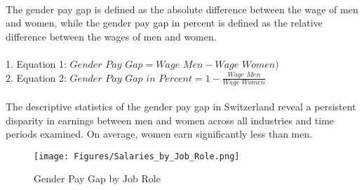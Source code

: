 \documentclass{article}
\begin{document}
\begin{table}[H]
\centering
{}\
\caption{Descriptive Statistics on Gender Pay Gap Across Switzerland and Years}
\end{table}

The gender pay gap is defined as the absolute difference between the wage of men and women, while the gender pay gap in percent is defined as the relative difference between the wages of men and women.\\
\\
  1. Equation 1: \(\textit{Gender Pay Gap} = \textit{Wage Men} - \textit{Wage Women)}\)\\
  2. Equation 2: \(\textit{Gender Pay Gap in Percent} = 1 - \frac{\textit{Wage Men}} 
 {\textit{Wage Women}}\)\\
\\
The descriptive statistics of the gender pay gap in Switzerland reveal a persistent disparity in earnings between men and women across all industries and time periods examined. On average, women earn significantly less than men. \\

\begin{figure}[h]
    \centering
    \texttt{[image: Figures/Salaries\_by\_Job\_Role.png]}
    \caption{Gender Pay Gap by Job Role}
    \label{fig:pay_gap_roles}
\end{figure}
\end{document}
